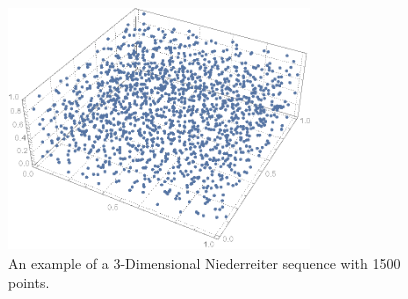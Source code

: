 \documentclass[12pt]{article}
\numberwithin{equation}{section}
\begin{document}
\begin{figure}[!htb]
    \centering
    \includegraphics[width=8cm]{Images/niederreiter3d.png}
    \caption{An example of a 3-Dimensional Niederreiter sequence with 1500 points.}
    \label{fig:3dexamplenied}
\end{figure}
\end{document}
